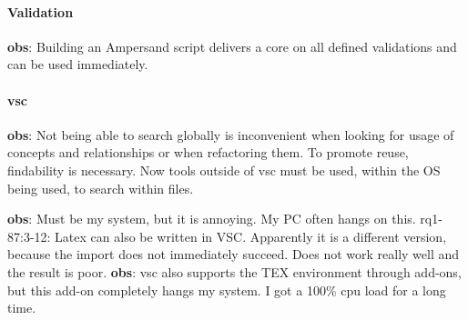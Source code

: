 \paragraph{Validation}
\begin{obs}\label{obs:rq1-57-1:7-11}
    \textbf{obs}: Building an Ampersand script delivers a core on all defined validations and can be used immediately.
\end{obs}

\paragraph{\acrlong{vsc}}
\begin{obs}\label{obs:rq1-22}
    \textbf{obs}: Not being able to search globally is inconvenient when looking for usage of concepts and relationships or when refactoring them.
    To promote reuse, findability is necessary.
    Now tools outside of \acrshort{vsc} must be used, within the OS being used, to search within files.
\end{obs}

\begin{obs}\label{obs:rq1-32:14-9}
    \textbf{obs}: Must be my system, but it is annoying.
    My PC often hangs on this.
     {rq1-87:3-12:} Latex can also be written in VSC.
    Apparently it is a different version, because the import does not immediately succeed.
    Does not work really well and the result is poor.
    \textbf{obs}: \acrlong{vsc} also supports the TEX environment through add-ons, but this add-on completely hangs my system.
    I got a 100\% cpu load for a long time. 
\end{obs}    

%
\newpage
